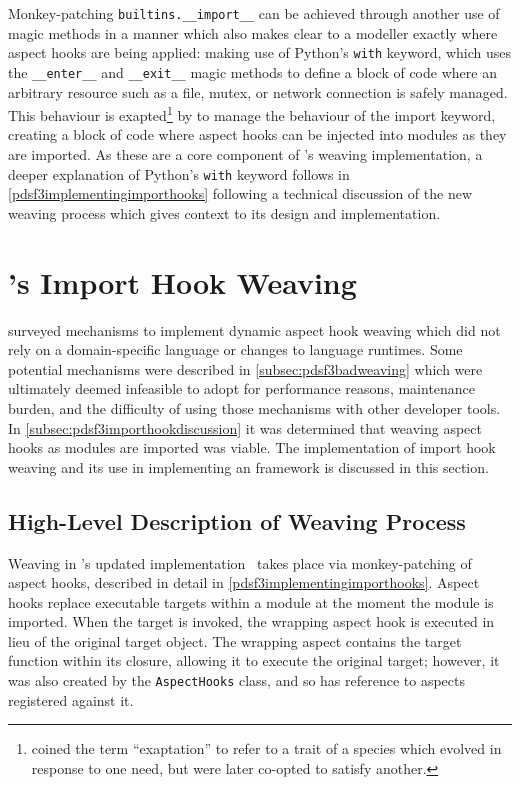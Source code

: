 Monkey-patching \lstinline{builtins.__import__} can be achieved through another
use of magic methods in a manner which also makes clear to a modeller exactly
where aspect hooks are being applied: making use of Python's \lstinline{with}
keyword, which uses the \lstinline{__enter__} and \lstinline{__exit__} magic
methods to define a block of code where an arbitrary resource such as a file,
mutex, or network connection is safely managed. This behaviour is
exapted\footnote{\citet{exaptation_origin} coined the term ``exaptation'' to
refer to a trait of a species which evolved in response to one need, but were
later co-opted to satisfy another.} by \pdsf{} to manage the behaviour of the
import keyword, creating a block of code where aspect hooks can be injected into
modules as they are imported. As these are a core component of \pdsf{}'s weaving
implementation, a deeper explanation of Python's \lstinline{with} keyword
follows in \cref{pdsf3implementingimporthooks} following a technical discussion
of the new weaving process which gives context to its design and implementation.



\section{\pdsf{}'s Import Hook Weaving}\label{sec:import_hooks}

 surveyed mechanisms to implement dynamic aspect hook
weaving which did not rely on a domain-specific language or changes to language
runtimes. Some potential mechanisms were described in
\cref{subsec:pdsf3badweaving} which were ultimately deemed infeasible to adopt
for performance reasons, maintenance burden, and the difficulty of using those
mechanisms with other developer tools. In
\cref{subsec:pdsf3importhookdiscussion} it was determined that weaving aspect
hooks as modules are imported was viable. The implementation of import hook
weaving and its use in implementing an \aop{} framework is discussed in this
section.


\subsection{High-Level Description of Weaving Process}\label{subsec:pdsf3_weaving_process}

Weaving in \pdsf{}'s updated implementation~\cite{pdsf_source_in_analysis_repo}
takes place via monkey-patching of aspect hooks, described in detail in
\cref{pdsf3implementingimporthooks}. Aspect hooks replace executable targets
within a module at the moment the module is imported. When the target is
invoked, the wrapping aspect hook is executed in lieu of the original target
object. The wrapping aspect contains the target function within its closure,
allowing it to execute the original target; however, it was also created by the
\lstinline{AspectHooks} class, and so has reference to aspects registered
against it. 

